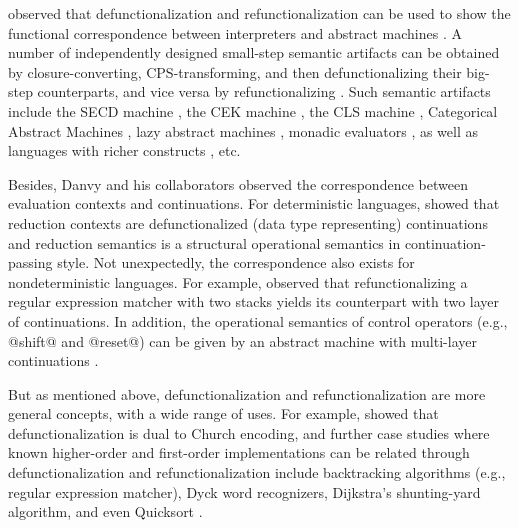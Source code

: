 \documentclass[acmsmall, review]{acmart}\settopmatter{}
\begin{document}
 observed that defunctionalization and refunctionalization
can be used to show the functional correspondence between interpreters and abstract machines
\cite{Ager:2003:FCE:888251.888254}. A number of independently designed small-step semantic artifacts can 
be obtained by closure-converting, CPS-transforming, and then defunctionalizing their big-step counterparts, 
and vice versa by refunctionalizing \cite{DANVY2009534}. 
Such semantic artifacts include the SECD machine \cite{10.1007/11431664_4, Ager:2003:FCE:888251.888254, DanvySECDJ},
the CEK machine \cite{Ager:2003:FCE:888251.888254}, the CLS machine  \cite{Ager:2003:FCE:888251.888254},
Categorical Abstract Machines \cite{Ager:2003:FCE:888251.888254}, lazy abstract machines \cite{AGER2004223}, 
monadic evaluators \cite{ager2005functional}, as well as languages with richer constructs
\cite{Danvy:2008:DIP:1411204.1411206, danvy2009towards, biernacka2009towards}, etc.

Besides, Danvy and his collaborators observed the correspondence between evaluation contexts and continuations.
For deterministic languages, \citet{Danvy:2008:DIP:1411204.1411206} showed that reduction contexts
are defunctionalized (data type representing) continuations and reduction semantics is a structural 
operational semantics in continuation-passing style.
Not unexpectedly, the correspondence also exists for nondeterministic languages. For example,
\citet{Danvy:2001:DW:773184.773202} observed that refunctionalizing a regular expression matcher 
with two stacks yields its counterpart with two layer of continuations.
In addition, the operational semantics of control operators (e.g., @shift@ and @reset@) can be given by an 
abstract machine with multi-layer continuations \cite{Danvy:1990:AC:91556.91622, lmcs:2269}. 

But as mentioned above, defunctionalization and refunctionalization are more general concepts, 
with a wide range of uses. For example, \citet{Danvy:2001:DW:773184.773202} showed that 
defunctionalization is dual to Church encoding, and further case studies where known
higher-order and first-order implementations can be related through defunctionalization
and refunctionalization include backtracking algorithms (e.g., regular expression matcher), 
Dyck word recognizers, Dijkstra's shunting-yard algorithm, and even Quicksort 
\cite{Danvy:2006:RW:2171265.2171268, DANVY2009534, Danvy:2001:DW:773184.773202}. \\

\end{document}

